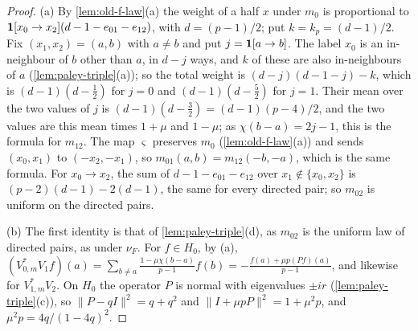 \begin{proof}
(a) By \cref{lem:old-f-law}(a) the weight of a half $x$ under $m_0$ is
proportional to $\mathbf 1[x_0\to x_2](d-1-e_{01}-e_{12})$, with $d=(p-1)/2$; put
$k=k_p=(d-1)/2$. Fix $(x_1,x_2)=(a,b)$ with $a\ne b$ and put $j=\mathbf 1[a\to b]$.
The label $x_0$ is an in-neighbour of $b$ other than $a$, in $d-j$ ways, and
$k$ of these are also in-neighbours of $a$ (\cref{lem:paley-triple}(a)); so
the total weight is $(d-j)(d-1-j)-k$, which is $(d-1)(d-\frac12)$ for $j=0$ and
$(d-1)(d-\frac52)$ for $j=1$. Their mean over the two values of $j$ is
$(d-1)(d-\frac32)=(d-1)(p-4)/2$, and the two values are this mean times
$1+\mu$ and $1-\mu$; as $\chi(b-a)=2j-1$, this is the formula for $m_{12}$. The
map $\varsigma$ preserves $m_0$ (\cref{lem:old-f-law}(a)) and sends $(x_0,x_1)$
to $(-x_2,-x_1)$, so $m_{01}(a,b)=m_{12}(-b,-a)$, which is the same formula.
For $x_0\to x_2$, the sum of $d-1-e_{01}-e_{12}$ over $x_1\notin\{x_0,x_2\}$ is
$(p-2)(d-1)-2(d-1)$, the same for every directed pair; so $m_{02}$ is uniform
on the directed pairs.

(b) The first identity is that of \cref{lem:paley-triple}(d), as $m_{02}$ is the
uniform law of directed pairs, as under $\nu_F$. For $f\in H_0$, by (a),
$(V^*_{0,m}V_1f)(a)=\sum_{b\ne a}\frac{1-\mu\chi(b-a)}{p-1}f(b)
=-\frac{f(a)+\mu p(Pf)(a)}{p-1}$, and likewise for $V^*_{1,m}V_2$. On $H_0$ the
operator $P$ is normal with eigenvalues $\pm ir$ (\cref{lem:paley-triple}(c)),
so $\|P-qI\|^2=q+q^2$ and $\|I+\mu pP\|^2=1+\mu^2p$, and
$\mu^2p=4q/(1-4q)^2$.


\end{proof}
